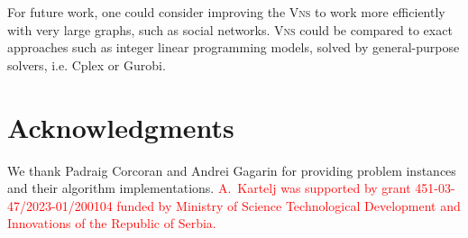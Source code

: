 \documentclass[dvipsnames,format=sigconf]{acmart} %
\begin{document}
 For future work, one could consider improving the \textsc{Vns} to work more efficiently with very large graphs, such as social networks.  \textsc{Vns} could be compared to exact approaches such as integer linear programming models, solved by {\color{red} general-purpose solvers}, i.e.  Cplex or Gurobi. 
  
\section*{Acknowledgments} 
We thank Padraig Corcoran and Andrei Gagarin for providing problem instances and their algorithm implementations.  
\textcolor{red}{A.~Kartelj was supported by grant 451-03-47/2023-01/200104 funded by Ministry of Science Technological Development and Innovations of the Republic of Serbia.}



 
\end{document}
